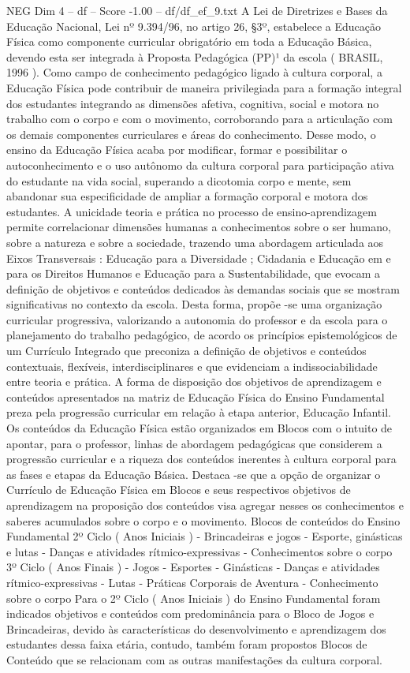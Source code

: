 \begin{textsample}{NEG Dim 4 – df – Score -1.00 – df/df\_ef\_9.txt}
A Lei de Diretrizes e Bases da Educação Nacional, Lei nº 9.394/96, no artigo 26, §3º, estabelece a Educação Física como componente curricular obrigatório em toda a Educação Básica, devendo esta ser integrada à Proposta Pedagógica (PP)¹ da escola ( BRASIL, 1996 ).
Como campo de conhecimento pedagógico ligado à cultura corporal, a Educação Física pode contribuir de maneira privilegiada para a formação integral dos estudantes integrando as dimensões afetiva, cognitiva, social e motora no trabalho com o corpo e com o movimento, corroborando para a articulação com os demais componentes curriculares e áreas do conhecimento.
Desse modo, o ensino da Educação Física acaba por modificar, formar e possibilitar o autoconhecimento e o uso autônomo da cultura corporal para participação ativa do estudante na vida social, superando a dicotomia corpo e mente, sem abandonar sua especificidade de ampliar a formação corporal e motora dos estudantes.
A unicidade teoria e prática no processo de ensino-aprendizagem permite correlacionar dimensões humanas a conhecimentos sobre o ser humano, sobre a natureza e sobre a sociedade, trazendo uma abordagem articulada aos Eixos Transversais : Educação para a Diversidade ; Cidadania e Educação em e para os Direitos Humanos e Educação para a Sustentabilidade, que evocam a definição de objetivos e conteúdos dedicados às demandas sociais que se mostram significativas no contexto da escola.
Desta forma, propõe -se uma organização curricular progressiva, valorizando a autonomia do professor e da escola para o planejamento do trabalho pedagógico, de acordo os princípios epistemológicos de um Currículo Integrado que preconiza a definição de objetivos e conteúdos contextuais, flexíveis, interdisciplinares e que evidenciam a indissociabilidade entre teoria e prática.
A forma de disposição dos objetivos de aprendizagem e conteúdos apresentados na matriz de Educação Física do Ensino Fundamental preza pela progressão curricular em relação à etapa anterior, Educação Infantil.
Os conteúdos da Educação Física estão organizados em Blocos com o intuito de apontar, para o professor, linhas de abordagem pedagógicas que considerem a progressão curricular e a riqueza dos conteúdos inerentes à cultura corporal para as fases e etapas da Educação Básica.
Destaca -se que a opção de organizar o Currículo de Educação Física em Blocos e seus respectivos objetivos de aprendizagem na proposição dos conteúdos visa agregar nesses os conhecimentos e saberes acumulados sobre o corpo e o movimento.
Blocos de conteúdos do Ensino Fundamental 2º Ciclo ( Anos Iniciais ) - Brincadeiras e jogos - Esporte, ginásticas e lutas - Danças e atividades rítmico-expressivas - Conhecimentos sobre o corpo 3º Ciclo ( Anos Finais ) - Jogos - Esportes - Ginásticas - Danças e atividades rítmico-expressivas - Lutas - Práticas Corporais de Aventura - Conhecimento sobre o corpo Para o 2º Ciclo ( Anos Iniciais ) do Ensino Fundamental foram indicados objetivos e conteúdos com predominância para o Bloco de Jogos e Brincadeiras, devido às características do desenvolvimento e aprendizagem dos estudantes dessa faixa etária, contudo, também foram propostos Blocos de Conteúdo que se relacionam com as outras manifestações da cultura corporal.

\end{textsample}
